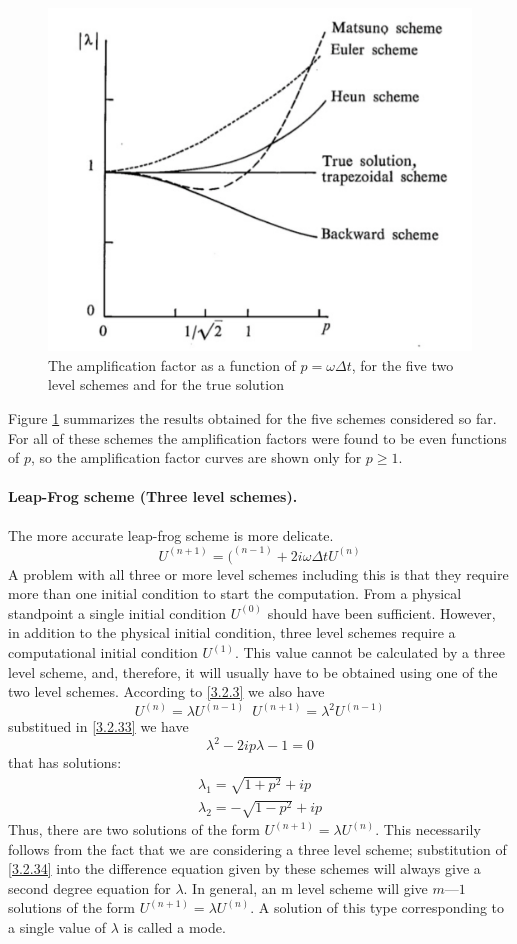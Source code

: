 \begin{figure}[h]
	\centering
	\includegraphics[width=0.50\linewidth]{uploads/Screenshot 2024-11-12 101958.png}
	\caption{The amplification factor as a function of $p=\omega\Delta t$, for the five two level schemes and for the true solution}
	\label{fig:3.2.1}
\end{figure}
Figure \ref{fig:3.2.1} summarizes the results obtained for the five schemes considered so far. For all of these schemes the amplification factors were found to be even functions of $p$, so the amplification factor curves are shown only for $p\geq 1$.
\paragraph{Leap-Frog scheme (Three level schemes).}
The more accurate leap-frog scheme is more delicate.
\begin{equation}\label{3.2.33}
	U^{(n+1)}=(^{(n-1)}+2i\omega\Delta tU^{(n)}
\end{equation}
A problem with all three or more level schemes including this is that they require more than one initial condition to start the computation. From a physical standpoint a single initial condition $U^{(0)}$ should have been sufficient. However, in addition to the physical initial condition, three level schemes require a computational initial condition $U^{(1)}$. This value cannot be calculated by a three level scheme, and, therefore, it will usually have to be obtained using one of the two level schemes. According to \ref{3.2.3} we also have
\begin{equation}\label{3.2.34}
	U^{(n)}=\lambda U^{(n-1)}\,\,\, U^{(n+1)}=\lambda^2U^{(n-1)}
\end{equation}
substitued in \ref{3.2.33} we have
$$\lambda^2-2ip\lambda-1=0$$ that has solutions:
\begin{align*}
	\lambda_1=\sqrt{1+p^2}+ip \\
	\lambda_2=-\sqrt{1-p^2}+ip
\end{align*}
Thus, there are two solutions of the form $U^{(n+1)}=\lambda U^{(n)}$. This necessarily follows from the fact that we are considering a three level scheme; substitution of \ref{3.2.34} into the difference equation given by these schemes will always give a second degree equation for $\lambda$. In general, an m level scheme will give $m — 1$ solutions of the form $U^{(n+1)}=\lambda U^{(n)}$. A solution of this type corresponding to a single value of $\lambda$ is called a mode.

